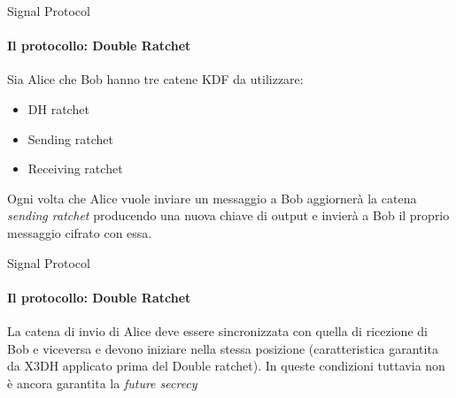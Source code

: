 \begin{frame}{Signal Protocol}
    \framesubtitle{Il protocollo: Double Ratchet}
    Sia Alice che Bob hanno tre catene KDF da utilizzare:
    \begin{itemize}
        \item DH ratchet
        \item Sending ratchet
        \item Receiving ratchet
    \end{itemize}\pause
    Ogni volta che Alice vuole inviare un messaggio a Bob aggiornerà la catena \textit{sending ratchet} producendo una nuova chiave di output e invierà a Bob il proprio messaggio cifrato con essa.
\end{frame}

\begin{frame}{Signal Protocol}
    \framesubtitle{Il protocollo: Double Ratchet}
    La catena di invio di Alice deve essere sincronizzata con quella di ricezione di Bob e viceversa e devono iniziare nella stessa posizione (caratteristica garantita da X3DH applicato prima del Double ratchet).\newline\pause
    In queste condizioni tuttavia non è ancora garantita la \textit{future secrecy}
\end{frame}

